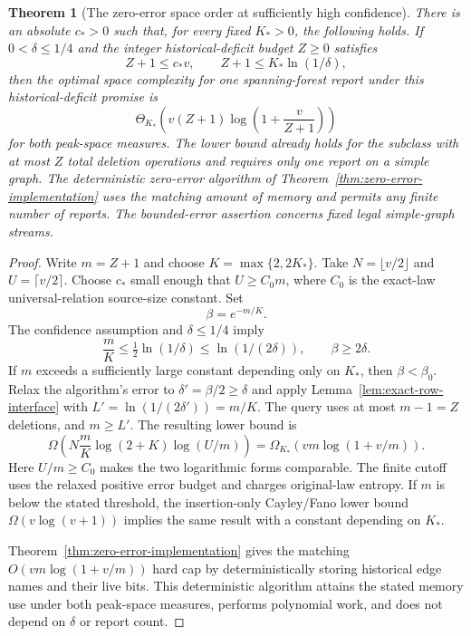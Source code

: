 \documentclass[11pt,letterpaper]{article}
\newtheorem{theorem}{Theorem}[section]
\numberwithin{equation}{section}
\begin{document}
\begin{theorem}[The zero-error space order at sufficiently high confidence]
\label{thm:small-budget-confidence}
There is an absolute $c_*>0$ such that, for every fixed $K_*>0$, the following holds.
If $0<\delta\le1/4$ and the integer historical-deficit budget $Z\ge0$ satisfies
\begin{equation}
Z+1\le c_*v,\qquad Z+1\le K_*\ln(1/\delta),
 \label{eq:ic2}
\end{equation}
then the optimal space complexity for one spanning-forest report under this historical-deficit promise is
\begin{equation}
\Theta_{K_*}\!\left(
 v(Z+1)\log\left(1+\frac v{Z+1}\right)\right)
 \label{eq:ic3}
\end{equation}
for both peak-space measures.
The lower bound already holds for the subclass with at most $Z$ total deletion operations and requires only one report on a simple graph.
The deterministic zero-error algorithm of Theorem~\ref{thm:zero-error-implementation} uses the matching amount of memory and permits any finite number of reports.
The bounded-error assertion concerns fixed legal simple-graph streams.
\end{theorem}
\begin{proof}
Write $m=Z+1$ and choose $K=\max\{2,2K_*\}$.
Take $N=\lfloor v/2\rfloor$ and $U=\lceil v/2\rceil$.
Choose $c_*$ small enough that $U\ge C_0m$, where $C_0$ is the exact-law universal-relation source-size constant.
Set
\[
 \beta=e^{-m/K}.
\]
The confidence assumption and $\delta\le1/4$ imply
\begin{equation}
\frac mK\le\tfrac12\ln(1/\delta)
 \le\ln(1/(2\delta)),\qquad \beta\ge2\delta.
 \label{eq:ic4}
\end{equation}
If $m$ exceeds a sufficiently large constant depending only on $K_*$, then $\beta<\beta_0$.
Relax the algorithm's error to $\delta'=\beta/2\ge\delta$ and apply Lemma~\ref{lem:exact-row-interface} with $L'=\ln(1/(2\delta'))=m/K$.
The query uses at most $m-1=Z$ deletions, and $m\ge L'$.
The resulting lower bound is
\[
 \Omega\!\left(N\frac mK\log(2+K)\log(U/m)\right)
 =\Omega_{K_*}\!\left(
 vm\log(1+v/m)\right).
\]
Here $U/m\ge C_0$ makes the two logarithmic forms comparable.
The finite cutoff uses the relaxed positive error budget and charges original-law entropy.
If $m$ is below the stated threshold, the insertion-only Cayley/Fano lower bound $\Omega(v\log(v+1))$ implies the same result with a constant depending on $K_*$.

Theorem~\ref{thm:zero-error-implementation} gives the matching $O(vm\log(1+v/m))$ hard cap by deterministically storing historical edge names and their live bits.
This deterministic algorithm attains the stated memory use under both peak-space measures, performs polynomial work, and does not depend on $\delta$ or report count.
\end{proof}
\end{document}
